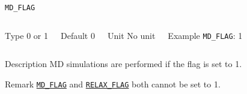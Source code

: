 \documentclass[xcolor=dvipsnames,t]{beamer}
\begin{document}
\begin{frame}[allowframebreaks]{\texttt{MD\_FLAG}} \label{MD_FLAG}
\vspace*{-12pt}
\begin{columns}
\begin{block}{Type}
0 or 1
\end{block}

\begin{block}{Default}
0
\end{block}

\begin{block}{Unit}
No unit
\end{block}

\begin{block}{Example}
\texttt{MD\_FLAG}: 1
\end{block}
\end{columns}

\begin{block}{Description}
MD simulations are performed if the flag is set to 1.
\end{block}

\begin{block}{Remark}
\hyperlink{MD_FLAG}{\texttt{MD\_FLAG}} and \hyperlink{RELAX_FLAG}{\texttt{RELAX\_FLAG}} both cannot be set to 1. 
\end{block}

\end{frame}
\end{document}

